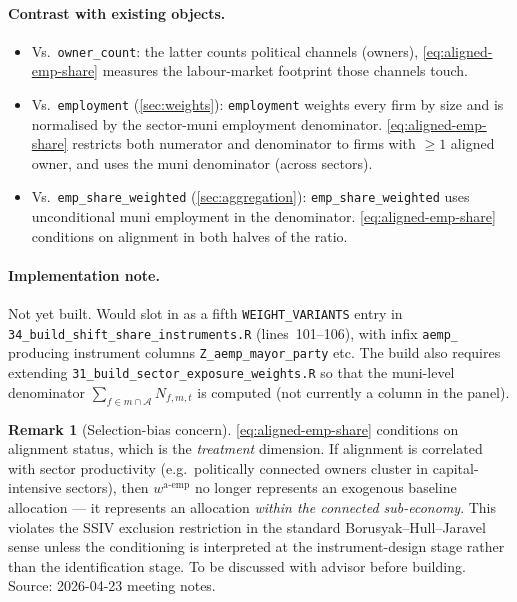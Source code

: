 \documentclass[12pt]{article}
\theoremstyle{definition}
\newtheorem{remark}{Remark}
\begin{document}
\paragraph{Contrast with existing objects.}
\begin{itemize}[leftmargin=2em, itemsep=2pt]
\item Vs.\ \texttt{owner\_count}: the latter counts political channels (owners), \cref{eq:aligned-emp-share} measures the labour-market footprint those channels touch.
\item Vs.\ \texttt{employment} (\cref{sec:weights}): \texttt{employment} weights every firm by size and is normalised by the sector-muni employment denominator. \cref{eq:aligned-emp-share} restricts both numerator and denominator to firms with $\ge 1$ aligned owner, and uses the muni denominator (across sectors).
\item Vs.\ \texttt{emp\_share\_weighted} (\cref{sec:aggregation}): \texttt{emp\_share\_weighted} uses unconditional muni employment in the denominator. \cref{eq:aligned-emp-share} conditions on alignment in both halves of the ratio.
\end{itemize}

\paragraph{Implementation note.}
Not yet built. Would slot in as a fifth \texttt{WEIGHT\_VARIANTS} entry in \texttt{34\_build\_shift\_share\_instruments.R} (lines~101--106), with infix \texttt{aemp\_} producing instrument columns \texttt{Z\_aemp\_mayor\_party} etc. The build also requires extending \texttt{31\_build\_sector\_exposure\_weights.R} so that the muni-level denominator $\sum_{f \in m \cap \mathcal{A}}\!N_{f,m,t}$ is computed (not currently a column in the panel).

\begin{remark}[Selection-bias concern]
\cref{eq:aligned-emp-share} conditions on alignment status, which is the \emph{treatment} dimension. If alignment is correlated with sector productivity (e.g.\ politically connected owners cluster in capital-intensive sectors), then $w^{\text{a-emp}}$ no longer represents an exogenous baseline allocation --- it represents an allocation \emph{within the connected sub-economy}. This violates the SSIV exclusion restriction in the standard Borusyak--Hull--Jaravel sense unless the conditioning is interpreted at the instrument-design stage rather than the identification stage. To be discussed with advisor before building. Source: 2026-04-23 meeting notes.
\end{remark}
\end{document}
